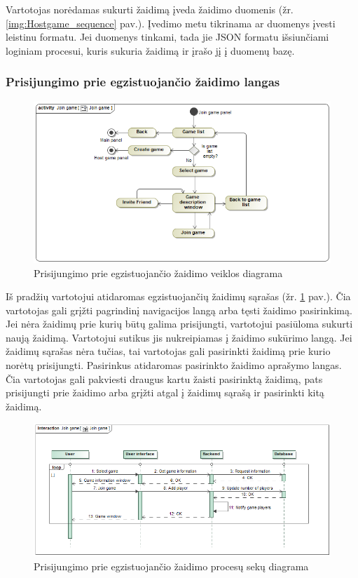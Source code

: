 \documentclass{VUMIFPSkursinis}
\begin{document}
			Vartotojas norėdamas sukurti žaidimą įveda žaidimo duomenis (žr. \ref{img:Hostgame_sequence} pav.). Įvedimo metu 
			tikrinama ar duomenys įvesti leistinu formatu. Jei duomenys tinkami, tada 
			jie JSON formatu išsiunčiami loginiam procesui, kuris sukuria žaidimą ir 
			įrašo jį į duomenų bazę.	
			
	\subsubsection{Prisijungimo prie egzistuojančio žaidimo langas}	
			\begin{figure}[H]
				\centering
				\includegraphics[scale=0.5]{img/JoinGame_activity}
				\caption{Prisijungimo prie egzistuojančio žaidimo veiklos diagrama}
				\label{img:JoinGame_activity}
			\end{figure}
			Iš pradžių vartotojui atidaromas egzistuojančių žaidimų sąrašas (žr. \ref{img:JoinGame_activity} pav.). Čia 
			vartotojas gali grįžti pagrindinį navigacijos langą arba tęsti žaidimo
			pasirinkimą. Jei nėra žaidimų prie kurių būtų galima prisijungti, vartotojui
			pasiūloma sukurti naują žaidimą. Vartotojui sutikus jis nukreipiamas į 
			žaidimo sukūrimo langą. Jei žaidimų sąrašas nėra tučias, tai vartotojas
			gali pasirinkti žaidimą prie kurio norėtų prisijungti. Pasirinkus atidaromas
			pasirinkto žaidimo aprašymo langas. Čia vartotojas gali pakviesti draugus
			kartu žaisti pasirinktą žaidimą, pats prisijungti prie žaidimo arba grįžti
			atgal į žaidimų sąrašą ir pasirinkti kitą žaidimą.
			\begin{figure}[H]
				\centering
				\includegraphics[scale=0.5]{img/JoinGame_sequence}
				\caption{Prisijungimo prie egzistuojančio žaidimo procesų sekų diagrama}
				\label{img:JoinGame_sequence}
			\end{figure}
\end{document}
